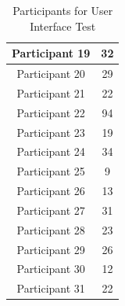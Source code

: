 \begin{table}[htbp]
\begin{tabular}{|c|c|}
    Participant 19             & 32                                \\ \hline
    Participant 20             & 29                                \\ \hline
    Participant 21             & 22                                \\ \hline
    Participant 22             & 94                                \\ \hline
    Participant 23             & 19                                \\ \hline
    Participant 24             & 34                                \\ \hline
    Participant 25             & 9                                \\ \hline
    Participant 26             & 13                                \\ \hline
    Participant 27             & 31                                \\ \hline
    Participant 28             & 23                                \\ \hline
    Participant 29             & 26                                \\ \hline
    Participant 30             & 12                                \\ \hline
    Participant 31             & 22                                  \\ \hline
    \end{tabular}
    \caption{Participants for User Interface Test}
    \label{fig:heatmapTimes}
    \end{table}



